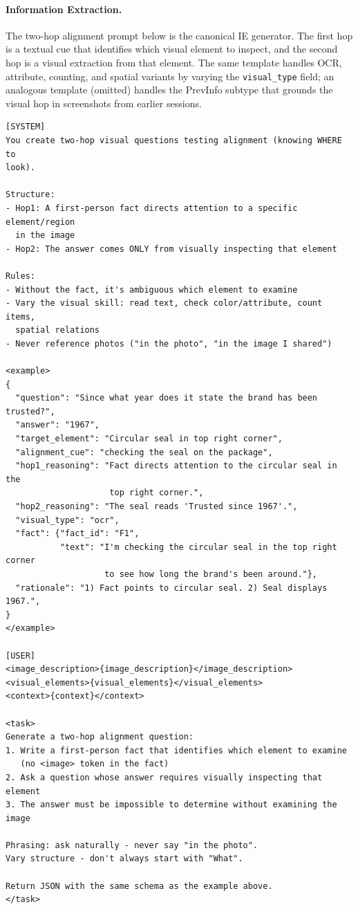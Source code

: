 \documentclass{llmxive}
\begin{document}
\paragraph{Information Extraction.}
The two-hop alignment prompt below is the canonical IE generator. The first hop is a textual cue that identifies which visual element to inspect, and the second hop is a visual extraction from that element. The same template handles OCR, attribute, counting, and spatial variants by varying the \texttt{visual\_type} field; an analogous template (omitted) handles the PrevInfo subtype that grounds the visual hop in screenshots from earlier sessions.

\begin{promptbox}[colback=black!5, colframe=white!40!black, title=Question Generation: IE (Two-Hop Alignment)]{}
\scriptsize
\begin{verbatim}
[SYSTEM]
You create two-hop visual questions testing alignment (knowing WHERE to
look).

Structure:
- Hop1: A first-person fact directs attention to a specific element/region
  in the image
- Hop2: The answer comes ONLY from visually inspecting that element

Rules:
- Without the fact, it's ambiguous which element to examine
- Vary the visual skill: read text, check color/attribute, count items,
  spatial relations
- Never reference photos ("in the photo", "in the image I shared")

<example>
{
  "question": "Since what year does it state the brand has been trusted?",
  "answer": "1967",
  "target_element": "Circular seal in top right corner",
  "alignment_cue": "checking the seal on the package",
  "hop1_reasoning": "Fact directs attention to the circular seal in the
                     top right corner.",
  "hop2_reasoning": "The seal reads 'Trusted since 1967'.",
  "visual_type": "ocr",
  "fact": {"fact_id": "F1",
           "text": "I'm checking the circular seal in the top right corner
                    to see how long the brand's been around."},
  "rationale": "1) Fact points to circular seal. 2) Seal displays 1967.",
}
</example>

[USER]
<image_description>{image_description}</image_description>
<visual_elements>{visual_elements}</visual_elements>
<context>{context}</context>

<task>
Generate a two-hop alignment question:
1. Write a first-person fact that identifies which element to examine
   (no <image> token in the fact)
2. Ask a question whose answer requires visually inspecting that element
3. The answer must be impossible to determine without examining the image

Phrasing: ask naturally - never say "in the photo".
Vary structure - don't always start with "What".

Return JSON with the same schema as the example above.
</task>
\end{verbatim}
\end{promptbox}
\end{document}
